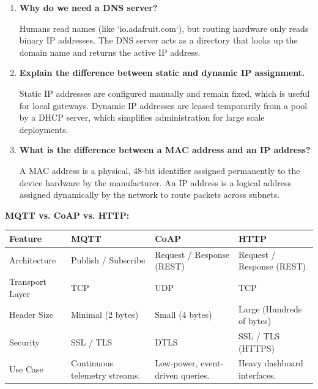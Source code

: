 \documentclass[12pt,a4paper]{article}
\newcommand{\Q}[1]{\textbf{#1}\par\noindent\ignorespaces}
\renewcommand{\arraystretch}{1.45}
\begin{document}
\begin{tcolorbox}[exambox, title={\textbf{Frequently Asked / Viva Questions}}]
\begin{enumerate}[leftmargin=*, topsep=0pt, label=\textbf{Q\arabic*.}, itemsep=6pt]
  \item \Q{Why do we need a DNS server?}
        Humans read names (like `io.adafruit.com`), but routing hardware only reads binary IP addresses. The DNS server acts as a directory that looks up the domain name and returns the active IP address.
        
  \item \Q{Explain the difference between static and dynamic IP assignment.}
        Static IP addresses are configured manually and remain fixed, which is useful for local gateways. Dynamic IP addresses are leased temporarily from a pool by a DHCP server, which simplifies administration for large scale deployments.
        
  \item \Q{What is the difference between a MAC address and an IP address?}
        A MAC address is a physical, 48-bit identifier assigned permanently to the device hardware by the manufacturer. An IP address is a logical address assigned dynamically by the network to route packets across subnets.
\end{enumerate}
\end{tcolorbox}

\vspace{6pt}

\begin{tcolorbox}[tikzbox, title={\textbf{Comparison Snapshot}}]
\textbf{MQTT vs. CoAP vs. HTTP:}\par\vspace{6pt}\noindent
{\renewcommand{\arraystretch}{1.35}%
\begin{tabularx}{\linewidth}{|B{3.2cm}|Y|Y|Y|}
\hline
\textbf{Feature} & \textbf{MQTT} & \textbf{CoAP} & \textbf{HTTP} \\
\hline
Architecture & Publish / Subscribe & Request / Response (REST) & Request / Response (REST) \\
\hline
Transport Layer & TCP & UDP & TCP \\
\hline
Header Size & Minimal (2 bytes) & Small (4 bytes) & Large (Hundreds of bytes) \\
\hline
Security & SSL / TLS & DTLS & SSL / TLS (HTTPS) \\
\hline
Use Case & Continuous telemetry streams. & Low-power, event-driven queries. & Heavy dashboard interfaces. \\
\hline
\end{tabularx}}
\end{tcolorbox}
\end{document}
